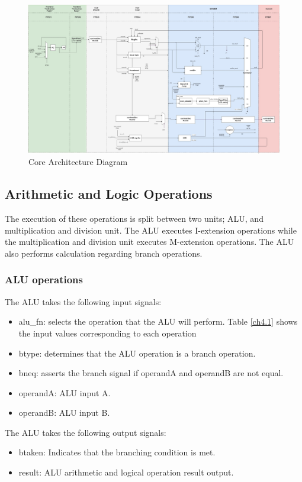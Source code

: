 \documentclass[../main.tex]{subfiles}
\begin{document}
\begin{figure}[p]
\centering
\includegraphics[scale = 0.27,angle = 90]{diagrams/CoreTopLevel.jpg}

\caption{Core Architecture Diagram}
\label{fig:img1}
\end{figure}

\subsection{Arithmetic and Logic Operations}
The execution of these operations is split between two units; ALU, and multiplication and division unit. The ALU executes I-extension operations while the multiplication and division unit executes M-extension operations. The ALU also performs calculation regarding branch operations.

\subsubsection{ALU operations}
The ALU takes the following input signals:
\begin{itemize}
  \item alu\_fn: selects the operation that the ALU will perform. Table \ref{ch4.1} shows the input values corresponding to each operation 
   \item btype: determines that the ALU operation is a branch operation. 
   \item bneq: asserts the branch signal if operandA and operandB are not equal.
  \item operandA: ALU input A.
  \item operandB: ALU input B.
\end{itemize}

\noindent The ALU takes the following output signals:
\begin{itemize}
  \item btaken: Indicates that the branching condition is met.
  \item result: ALU arithmetic and logical operation result output.
\end{itemize}
\end{document}

